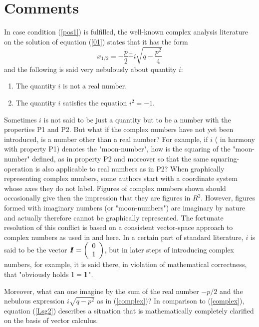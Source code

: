 \documentclass{amsart}
\theoremstyle{definition}
\theoremstyle{remark}
\numberwithin{equation}{section}
\begin{document}
\section{Comments}
In case condition (\ref{pos1}) is fulfilled, the well-known complex analysis literature on the solution of equation (\ref{01}) states  that it has the form
\begin{equation}\label{complex}x_{1/2}=-\frac{p}{2}\overset{+}-i\sqrt{q-\frac{p^2}{4}}
\end{equation}
and the following is said very nebulously about quantity $i$:
\begin{enumerate}
\item[P1] The quantity $i$ is not a real number.
\item[P2] The quantity $i$ satisfies the equation $i^2=-1.$
\end{enumerate}
Sometimes $i$ is not said to be just a quantity but to be a number with the properties P1 and P2. But what if the complex numbers have not yet been introduced, is a number other than a real number? For example, if $i$ ( in harmony with property P1)  denotes the "moon-number", how is the squaring of the "moon-number" defined, as in property P2 and moreover so that the same squaring-operation is also applicable to real numbers as in P2?
\newline
When graphically representing complex numbers, some authors start with a coordinate system whose axes they do not label. Figures of complex numbers shown should occasionally give then the impression that they are figures in $R^2.$ However, figures formed with imaginary numbers (or "moon-numbers") are imaginary by nature and actually therefore cannot be graphically represented. The fortunate resolution of this conflict is based on a consistent vector-space approach to complex numbers as used in \cite{Richter2020, Richter2022b} and here.
\newline
\qquad In a certain part of standard literature, $i$ is said  to be the vector
$I\hspace{-.14cm}{I}=\left(\begin{array}{c}
0 \\
1 \\
\end{array}
\right)$,
but in later steps of introducing complex numbers, for example, it is said there, in violation of mathematical correctness, that "obviously holds $1=1\hspace{-.15cm}{1}$".

Moreover, what can one imagine by the sum of the real number $-p/2$ and the nebulous expression $i\sqrt{q-p^2}$ as in (\ref{complex})? In comparison to (\ref{complex}), equation (\ref{Lsg2}) describes a  situation that is mathematically completely clarified on the basis of vector calculus.
\end{document}
